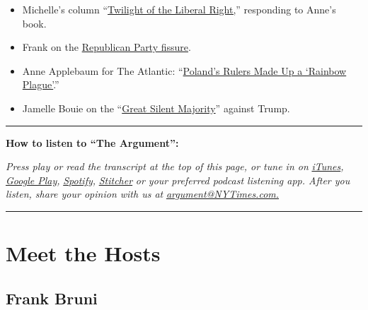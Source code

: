 \begin{itemize}
\item
  Michelle's column
  ``\href{https://www.nytimes3xbfgragh.onion/2020/07/27/opinion/anne-applebaum-twilight-of-democracy.html}{Twilight
  of the Liberal Right,}'' responding to Anne's book.
\item
  Frank on the
  \href{https://www.nytimes3xbfgragh.onion/2020/07/11/opinion/sunday/republican-party-trump-2020.html}{Republican
  Party fissure}.
\item
  Anne Applebaum for The Atlantic:
  ``\href{https://www.theatlantic.com/ideas/archive/2020/07/polands-rulers-manufactured-a-rainbow-plague/614113/}{Poland's
  Rulers Made Up a `Rainbow Plague'}.''
\item
  Jamelle Bouie on the
  ``\href{https://www.nytimes3xbfgragh.onion/2020/07/24/opinion/trump-silent-majority.html}{Great
  Silent Majority}'' against Trump.
\end{itemize}

\begin{center}\rule{0.5\linewidth}{\linethickness}\end{center}

\textbf{How to listen to ``The Argument'':}

\emph{Press play or read the transcript at the top of this page, or tune
in on}
\href{https://itunes.apple.com/us/podcast/the-argument/id1438024613?mt=2}{\emph{iTunes}}\emph{,}
\href{https://play.google.com/music/listen?u=0\#/ps/Idxib4hsg3yviao4gtym76knjjy}{\emph{Google
Play}}\emph{,}
\href{https://open.spotify.com/episode/5fIsHqqunLBwoxPSUUSGre?si=Rz5D9VnlRFKdGMu8ixzBOw}{\emph{Spotify}}\emph{,}
\href{https://www.stitcher.com/podcast/the-new-york-times/the-argument}{\emph{Stitcher}}
\emph{or your preferred podcast listening app. After you listen, share
your opinion with us at}
\href{mailto:argument@NYTimes.com}{\emph{argument@NYTimes.com.}}

\begin{center}\rule{0.5\linewidth}{\linethickness}\end{center}

\hypertarget{meet-the-hosts}{%
\section{Meet the Hosts}\label{meet-the-hosts}}

\hypertarget{frank-bruni}{%
\subsection{Frank Bruni}\label{frank-bruni}}

